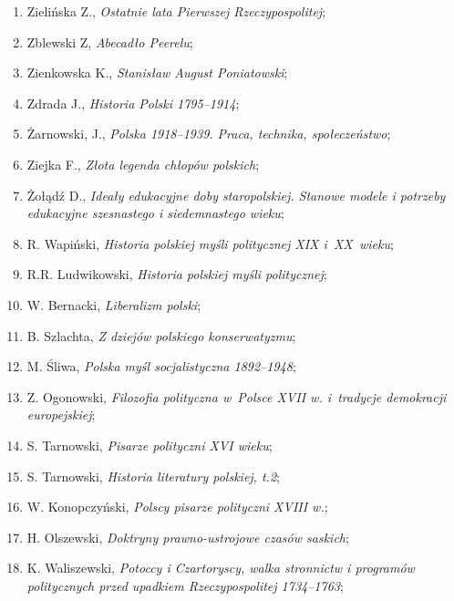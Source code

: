 \documentclass[a4paper,11pt]{article}
\begin{document}
\begin{enumerate}
\item Zielińska Z., \textit{Ostatnie lata Pierwszej Rzeczypospolitej};

\item Zblewski Z, \textit{Abecadło Peerelu};

\item Zienkowska K., \textit{Stanisław August Poniatowski};

\item Zdrada J., \textit{Historia Polski 1795--1914};

\item Żarnowski, J., \textit{Polska 1918--1939. Praca, technika,
    społeczeństwo};

\item Ziejka F., \textit{Złota legenda chłopów polskich};

\item Żołądź D., \textit{Ideały edukacyjne doby staropolskiej. Stanowe
    modele i potrzeby edukacyjne szesnastego i siedemnastego wieku};

\item R. Wapiński, \textit{Historia polskiej myśli politycznej XIX
    i~XX~wieku};

\item R.R. Ludwikowski, \textit{Historia polskiej myśli politycznej};

\item W. Bernacki, \textit{Liberalizm polski};

\item B. Szlachta, \textit{Z dziejów polskiego konserwatyzmu};

\item M. Śliwa, \textit{Polska myśl socjalistyczna 1892--1948};

\item Z. Ogonowski, \textit{Filozofia polityczna w~Polsce XVII w.
    i~tradycje demokracji europejskiej};

\item S. Tarnowski, \textit{Pisarze polityczni XVI wieku};

\item S. Tarnowski, \textit{Historia literatury polskiej, t.2};

\item W. Konopczyński, \textit{Polscy pisarze polityczni XVIII w.};

\item H. Olszewski, \textit{Doktryny prawno-ustrojowe czasów saskich};

\item K. Waliszewski, \textit{Potoccy i Czartoryscy, walka stronnictw i
    programów politycznych przed upadkiem Rzeczypospolitej 1734--1763};


\end{enumerate}
\end{document}
